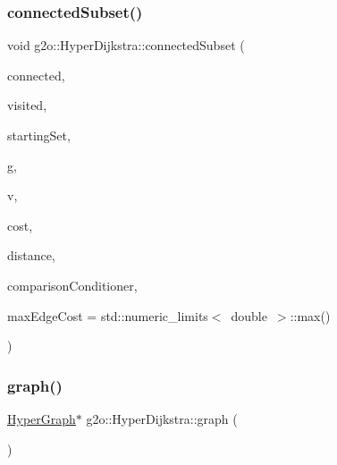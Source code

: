 \mbox{\label{structg2o_1_1_hyper_dijkstra_a846232e98c8175ec2fff784fc3271ad7}} 
\subsubsection{\texorpdfstring{connected\+Subset()}{connectedSubset()}}
{\footnotesize\ttfamily void g2o\+::\+Hyper\+Dijkstra\+::connected\+Subset (\begin{DoxyParamCaption}\item[{\mbox{\hyperlink{classg2o_1_1_hyper_graph_a703938cdb4bb636860eed55a2489d70c}{Hyper\+Graph\+::\+Vertex\+Set}} \&}]{connected,  }\item[{\mbox{\hyperlink{classg2o_1_1_hyper_graph_a703938cdb4bb636860eed55a2489d70c}{Hyper\+Graph\+::\+Vertex\+Set}} \&}]{visited,  }\item[{\mbox{\hyperlink{classg2o_1_1_hyper_graph_a703938cdb4bb636860eed55a2489d70c}{Hyper\+Graph\+::\+Vertex\+Set}} \&}]{starting\+Set,  }\item[{\mbox{\hyperlink{classg2o_1_1_hyper_graph}{Hyper\+Graph}} $\ast$}]{g,  }\item[{\mbox{\hyperlink{classg2o_1_1_hyper_graph_1_1_vertex}{Hyper\+Graph\+::\+Vertex}} $\ast$}]{v,  }\item[{\mbox{\hyperlink{structg2o_1_1_hyper_dijkstra_1_1_cost_function}{Hyper\+Dijkstra\+::\+Cost\+Function}} $\ast$}]{cost,  }\item[{double}]{distance,  }\item[{double}]{comparison\+Conditioner,  }\item[{double}]{max\+Edge\+Cost = {\ttfamily std\+:\+:numeric\+\_\+limits$<$~double~$>$\+:\+:max()} }\end{DoxyParamCaption})\hspace{0.3cm}{\ttfamily [static]}}

\mbox{\label{structg2o_1_1_hyper_dijkstra_a578a9eb1874d9802dbd37a2f1681c196}} 
\subsubsection{\texorpdfstring{graph()}{graph()}}
{\footnotesize\ttfamily \mbox{\hyperlink{classg2o_1_1_hyper_graph}{Hyper\+Graph}}$\ast$ g2o\+::\+Hyper\+Dijkstra\+::graph (\begin{DoxyParamCaption}{ }\end{DoxyParamCaption})\hspace{0.3cm}{\ttfamily [inline]}}

